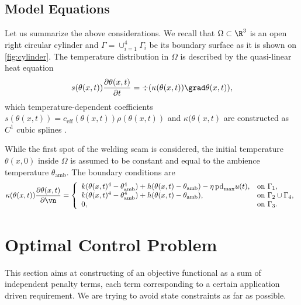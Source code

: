 \subsection{Model Equations}
\label{subsec:equations}

Let us summarize the above considerations.
We recall that $\Omega\subset \R^3$ is an open right circular cylinder and $\Gamma = \cup_{i=1}^4 \Gamma_i$ be its boundary surface as it is shown on \cref{fig:cylinder}. The temperature distribution in $\Omega$ is described by the quasi-linear heat equation
\begin{equation} \label{eq:heat_eq}
	s(\theta(x,t)) \frac{\partial \theta(x,t)}{\partial t} = \div (\kappa(\theta(x,t)) \grad\theta(x,t)),
\end{equation}
which temperature-dependent coefficients $s(\theta(x,t)) = c_\text{eff}(\theta(x,t)) \rho(\theta(x,t))$ and $\kappa(\theta(x,t)$ are constructed as $C^1$ cubic splines .

While the first spot of the welding seam is considered, the initial temperature $\theta(x,0)$ inside $\Omega$ is assumed to be constant and equal to the ambience temperature $\theta_\text{amb}$.
The boundary conditions are
\begin{equation} \label{eq:heat_eq_bc}
	\kappa(\theta(x,t)) \frac{\partial \theta(x,t)}{\partial \vn} = \left\{
		\begin{array}{ll}
			k (\theta(x,t)^4 - \theta_\text{amb}^4) + h (\theta(x,t) - \theta_\text{amb}) - \eta\, \text{pd}_{\max} u(t), & \text{on}\ \Gamma_1, \\
			k (\theta(x,t)^4 - \theta_\text{amb}^4) + h (\theta(x,t) - \theta_\text{amb}), & \text{on}\ \Gamma_2 \cup \Gamma_4, \\
			0, & \text{on}\ \Gamma_3.
		\end{array} \right.
\end{equation}

\section{Optimal Control Problem}
\label{sec:objective}

This section aims at constructing of an objective functional as a sum of independent penalty terms, each term corresponding to a certain application driven requirement.
We are trying to avoid state constraints as far as possible.

